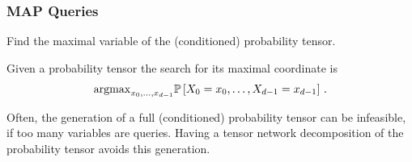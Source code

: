 
%
%
%




\subsubsection{MAP Queries}

Find the maximal variable of the (conditioned) probability tensor.

Given a probability tensor the search for its maximal coordinate is 
\begin{align}
	\mathrm{argmax}_{x_{0},\ldots,x_{d-1}} \mathbb{P}\left[X_{0}=x_{0},\ldots,X_{d-1}=x_{d-1}\right] \, .
\end{align}

Often, the generation of a full (conditioned) probability tensor can be infeasible, if too many variables are queries.
Having a tensor network decomposition of the probability tensor avoids this generation.

